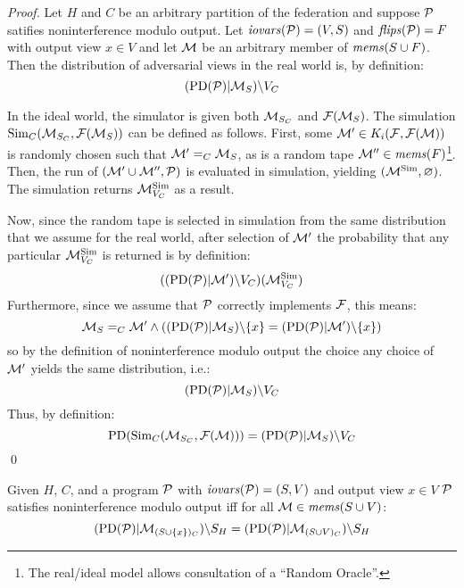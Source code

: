 \begin{proof}
  Let $H$ and $C$ be an arbitrary partition of the federation and
  suppose $\mathcal{P}$ satifies noninterference modulo output. Let
  $\mathit{iovars}(\mathcal{P}) = (V,S)$ and $\mathit{flips}(\mathcal{P}) = F$ with output view $x
  \in V$ and let $\mathcal{M}$ be an arbitrary member of $\mathit{mems}(S \cup
  F)$. Then the distribution of adversarial views in the real world
  is, by definition:
  $$(\mathrm{PD}(\mathcal{P})|\mathcal{M}_S)\backslash V_C$$

  In the ideal world, the simulator is given both $\mathcal{M}_{S_C}$ and
  $\mathcal{F}(\mathcal{M}_S)$.  The simulation $\mathrm{Sim}_C(\mathcal{M}_{S_C},
  \mathcal{F}(\mathcal{M}_S))$ can be defined as follows. First, some $\mathcal{M}'
  \in K_i(\mathcal{F},\mathcal{F}(\mathcal{M}))$ is randomly chosen such that
  $\mathcal{M}' =_C \mathcal{M}_S$, as is a random tape $\mathcal{M}'' \in
  \mathit{mems}(F)$\footnote{The real/ideal model allows consultation of a
  ``Random Oracle''.}. Then, the run of $(\mathcal{M}' \cup \mathcal{M}'',
  \mathcal{P})$ is evaluated in simulation, yielding $(\mathcal{M}^{\mathrm{Sim}},\varnothing)$.
  The simulation returns $\mathcal{M}^{\mathrm{Sim}}_{V_C}$ as a result.

  Now, since the random tape is selected in simulation from the same distribution
  that we assume for the real world, after selection of $\mathcal{M}'$ the
  probability that any particular $\mathcal{M}^{\mathrm{Sim}}_{V_C}$ is returned is by definition:
  $$
   ((\mathrm{PD}(\mathcal{P})|\mathcal{M}')\backslash V_C)(\mathcal{M}^{\mathrm{Sim}}_{V_C})
  $$
  Furthermore, since we assume that $\mathcal{P}$ correctly implements $\mathcal{F}$, this
  means:
  $$
  \mathcal{M}_S =_C \mathcal{M}' \wedge
     ((\mathrm{PD}(\mathcal{P})|\mathcal{M}_S)\backslash\{ x \} =
      (\mathrm{PD}(\mathcal{P})|\mathcal{M}')\backslash\{ x \})
  $$
  so by the definition of noninterference modulo output the choice
  any choice of $\mathcal{M}'$ yields the same distribution, i.e.:
  $$(\mathrm{PD}(\mathcal{P})|\mathcal{M}_S)\backslash V_C$$
  Thus, by definition:
  $$
   \mathrm{PD}(\mathrm{Sim}_C(\mathcal{M}_{S_C},\mathcal{F}(\mathcal{M}))) = (\mathrm{PD}(\mathcal{P})|\mathcal{M}_S)\backslash V_C
  $$
  \qed
\end{proof}

\begin{lemma}
  Given $H$, $C$, and a program $\mathcal{P}$ with $\mathit{iovars}(\mathcal{P}) = (S,V)$ and
  output view $x \in V$
  $\mathcal{P}$ satisfies noninterference modulo output iff for all
  $\mathcal{M} \in \mathit{mems}(S \cup V)$:
  $$(\mathrm{PD}(\mathcal{P})|\mathcal{M}_{(S \cup \{x\})_C})\backslash S_H =
    (\mathrm{PD}(\mathcal{P})|\mathcal{M}_{(S\cup V)_C})\backslash S_H $$
\end{lemma}
